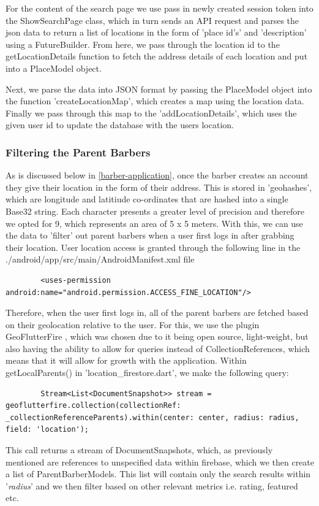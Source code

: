 \documentclass[12pt]{article}
\begin{document}
	For the content of the search page we use pass in newly created session token into the ShowSearchPage class, which in turn sends an API request and parses the json data to return a list of locations in the form of 'place id's' and 'description' using a FutureBuilder. From here, we pass through the location id to the getLocationDetails function to fetch the address details of each location and put into a PlaceModel object.
	
	Next, we parse the data into JSON format by passing the PlaceModel object into the function 'createLocationMap', which creates a map using the location data. Finally we pass through this map to the 'addLocationDetails', which uses the given user id to update the database with the users location.
	
	\subsubsection{Filtering the Parent Barbers}
	As is discussed below in \autoref{barber-application}, once the barber creates an account they give their location in the form of their address. This is stored in 'geohashes', which are longitude and latitiude co-ordinates that are hashed into a single Base32 string. Each character presents a greater level of precision and therefore we opted for 9, which represents an area of 5 x 5 meters. With this, we can use the data to 'filter' out parent barbers when a user first logs in after grabbing their location. User location access is granted through the following line in the ./android/app/src/main/AndroidManifest.xml file
	\begin{lstlisting}
		<uses-permission android:name="android.permission.ACCESS_FINE_LOCATION"/>
	\end{lstlisting}

	Therefore, when the user first logs in, all of the parent barbers are fetched based on their geolocation relative to the user. For this, we use the plugin GeoFlutterFire \cite{GeoflutterfireFlutterPackage2021}, which was chosen due to it being open source, light-weight, but also having the ability to allow for queries instead of CollectionReferences, which means that it will allow for growth with the application. Within getLocalParents() in 'location\_firestore.dart', we make the following query:
	\begin{lstlisting}
		Stream<List<DocumentSnapshot>> stream = geoflutterfire.collection(collectionRef: _collectionReferenceParents).within(center: center, radius: radius, field: 'location');
	\end{lstlisting}
	This call returns a stream of DocumentSnapshots, which, as previously mentioned are references to unspecified data within firebase, which we then create a list of ParentBarberModels. This list will contain only the search results within '\emph{radius}' and we then filter based on other relevant metrics i.e. rating, featured etc.
	
\end{document}
